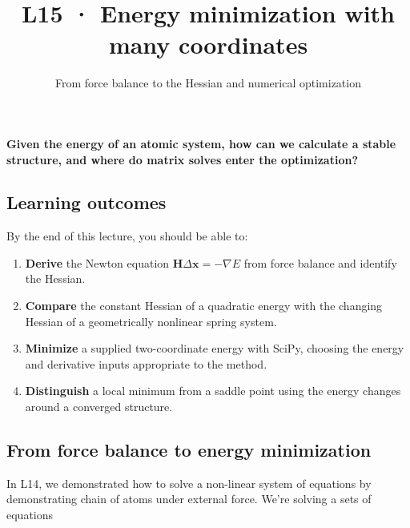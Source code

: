 \documentclass[
  11pt,
  letterpaper,
  DIV=11,
  numbers=noendperiod]{scrartcl}
\title{L15 · Energy minimization with many coordinates}
\subtitle{From force balance to the Hessian and numerical optimization}
\author{}
\date{}
\providecommand{\tightlist}{%
  \setlength{\itemsep}{0pt}\setlength{\parskip}{0pt}}
\begin{document}
\maketitle


\begin{tcolorbox}[enhanced jigsaw, arc=.35mm, bottomrule=.15mm, bottomtitle=1mm, breakable, colback=white, colbacktitle=quarto-callout-note-color!10!white, colframe=quarto-callout-note-color-frame, coltitle=black, left=2mm, leftrule=.75mm, opacityback=0, opacitybacktitle=0.6, rightrule=.15mm, title=\textcolor{quarto-callout-note-color}{\faInfo}\hspace{0.5em}{Central question}, titlerule=0mm, toprule=.15mm, toptitle=1mm]

\textbf{Given the energy of an atomic system, how can we calculate a
stable structure, and where do matrix solves enter the optimization?}

\end{tcolorbox}

\subsection{Learning outcomes}\label{learning-outcomes}

By the end of this lecture, you should be able to:

\begin{enumerate}
\def\labelenumi{\arabic{enumi}.}
\tightlist
\item
  \textbf{Derive} the Newton equation
  \(\mathbf H\Delta\mathbf x=-\nabla E\) from force balance and identify
  the Hessian.
\item
  \textbf{Compare} the constant Hessian of a quadratic energy with the
  changing Hessian of a geometrically nonlinear spring system.
\item
  \textbf{Minimize} a supplied two-coordinate energy with SciPy,
  choosing the energy and derivative inputs appropriate to the method.
\item
  \textbf{Distinguish} a local minimum from a saddle point using the
  energy changes around a converged structure.
\end{enumerate}

\subsection{From force balance to energy
minimization}\label{from-force-balance-to-energy-minimization}

In L14, we demonstrated how to solve a non-linear system of equations by
demonstrating chain of atoms under external force. We're solving a sets
of equations
\end{document}
